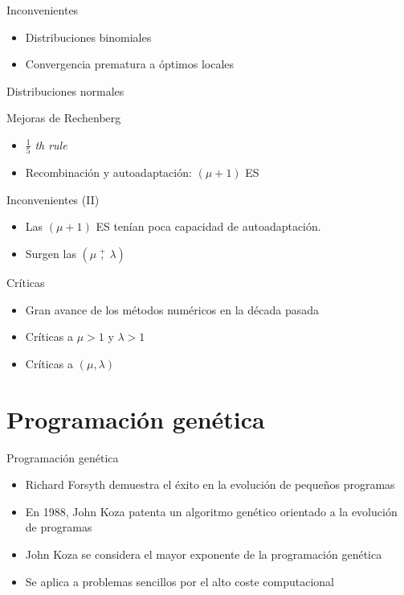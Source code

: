 \documentclass[10pt]{beamer}
\begin{document}
\begin{frame}{Inconvenientes}
  \begin{itemize}\itemsep2pt
  \item Distribuciones binomiales
  \item Convergencia prematura a óptimos locales
  \end{itemize}

  \begin{center}
    Distribuciones normales
  \end{center}
\end{frame}

\begin{frame}{Mejoras de Rechenberg}
  \begin{itemize}\itemsep2pt
  \item $\frac{1}{5}$ \emph{th rule}
  \item Recombinación y autoadaptación: $(\mu + 1)$ ES
  \end{itemize}
\end{frame}

\begin{frame}{Inconvenientes (II)}
  \begin{itemize}[<+- | alert@+>]
  \item Las $(\mu + 1)$ ES tenían poca capacidad de autoadaptación.
  \item Surgen las $\left( \mu \ \overset{+}{,} \ \lambda \right)$
  \end{itemize}
\end{frame}

\begin{frame}{Críticas}
  \begin{itemize}\itemsep2pt
  \item Gran avance de los métodos numéricos en la década pasada
  \item Críticas a $\mu > 1$ y $\lambda > 1$
  \item Críticas a $(\mu, \lambda)$
  \end{itemize}
\end{frame}

\section{Programación genética}

\begin{frame}{Programación genética}

 \begin{itemize}\itemsep2pt
  \item Richard Forsyth demuestra el éxito en la evolución de pequeños programas
  \item En 1988, John Koza patenta un algoritmo genético orientado a la evolución de programas
  \item John Koza se considera el mayor exponente de la programación genética
  \item Se aplica a problemas sencillos por el alto coste computacional
  \end{itemize}
  
\end{frame}
\end{document}
